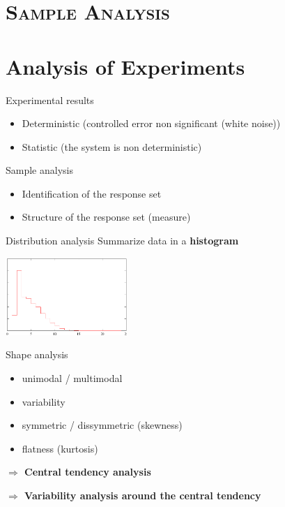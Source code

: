 \documentclass[xcolor=x11names,compress,8pt,
]{beamer}
\renewcommand{\(}{\begin{columns}}
\renewcommand{\)}{\end{columns}}
\newcommand{\<}[1]{\begin{column}{#1}}
\renewcommand{\>}{\end{column}}
\begin{document}
\section[{\scshape Sample Analysis}]{{\scshape Sample Analysis}}

\section{Analysis of Experiments}
\begin{frame}{Experimental results}
\begin{itemize}
\item Deterministic (controlled error non significant (white noise))
\item Statistic (the system is non deterministic)
\end{itemize}
\begin{block}{Sample analysis}
\begin{itemize}
\item Identification of the response set
\item Structure of the response set (measure)
\end{itemize}

\end{block}
\end{frame}

\begin{frame}{Distribution  analysis}
Summarize data in a {\bf histogram}
\begin{center}
\includegraphics[width=4.6cm]{histogramme.pdf}
\end{center}
\begin{block}{Shape analysis}
\begin{itemize}
\item unimodal / multimodal
\item variability
\item symmetric / dissymmetric (skewness)
\item flatness (kurtosis)
\end{itemize}
\alert{\bf $\Longrightarrow$ Central tendency analysis} 

\alert{\bf $\Longrightarrow$ Variability analysis around the central tendency} 

\end{block}
\end{frame}
\end{document}
